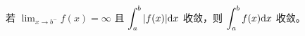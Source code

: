 \begin{Theo}[绝对收敛必收敛]

    若 $ {\displaystyle\lim_{x\rightarrow b^-}}f(x)=\infty $ 且 $ \displaystyle \int_a^{b}|f(x)|\mathrm{d}x $ 收敛，则
    $ \displaystyle \int_a^{b}f(x)\mathrm{d}x $ 收敛。
\end{Theo}
